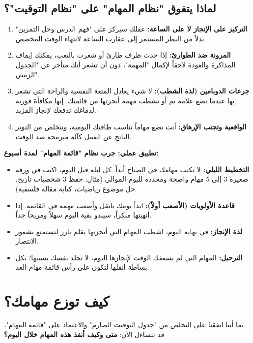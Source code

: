 \documentclass[12pt,a4paper]{book}
\begin{document}
\subsection*{لماذا يتفوق "نظام المهام" على "نظام التوقيت"؟}
\begin{enumerate}
	\item \textbf{التركيز على الإنجاز لا على الساعة:} عقلك سيركز على "فهم الدرس وحل التمرين" بدلاً من النظر المستمر إلى عقارب الساعة لانتهاء الوقت المخصص.
	\item \textbf{المرونة ضد الطوارئ:} إذا حدث ظرف طارئ أو شعرت بالتعب، يمكنك إيقاف المذاكرة والعودة لاحقاً لإكمال "المهمة"، دون أن تشعر أنك متأخر عن "الجدول الزمني".
	\item \textbf{جرعات الدوبامين (لذة الشطب):} لا شيء يعادل المتعة النفسية والراحة التي تشعر بها عندما تضع علامة تم أو تشطب مهمة أنجزتها من قائمتك. إنها مكافأة فورية لدماغك تدفعك لإنجاز المزيد.
	\item \textbf{الواقعية وتجنب الإرهاق:} أنت تضع مهاماً تناسب طاقتك اليومية، وتتخلص من التوتر الناتج عن العمل كآلة مبرمجة ضد الوقت.
\end{enumerate}

\begin{exercise}
	\textbf{تطبيق عملي: جرب نظام "قائمة المهام" لمدة أسبوع:}
	\begin{itemize}
		\item \textbf{التخطيط الليلي:} لا تكتب مهامك في الصباح أبداً. كل ليلة قبل النوم، اكتب في ورقة صغيرة 3 إلى 5 مهام واضحة ومحددة لليوم الموالي (مثال: حفظ 3 شخصيات تاريخ، حل موضوع رياضيات، كتابة مقالة فلسفية).
		\item \textbf{قاعدة الأولويات (الأصعب أولاً):} ابدأ يومك بأثقل وأصعب مهمة في القائمة. إذا أنهيتها مبكراً، سيبدو بقية اليوم سهلاً ومريحاً جداً.
		\item \textbf{لذة الإنجاز:} في نهاية اليوم، اشطب المهام التي أنجزتها بقلم بارز لتستمتع بشعور الانتصار.
		\item \textbf{الترحيل:} المهام التي لم يسعفك الوقت لإنجازها اليوم، لا تجلد نفسك بسببها؛ بكل بساطة انقلها لتكون على رأس قائمة مهام الغد.
	\end{itemize}
\end{exercise}


	\section{كيف توزع مهامك؟}
	\label{sec:ideal-daily-system}
	
	بما أننا اتفقنا على التخلص من "جدول التوقيت الصارم" والاعتماد على "قائمة المهام"، قد تتساءل الآن: \textbf{متى وكيف أنفذ هذه المهام خلال اليوم؟}
	
\end{document}
